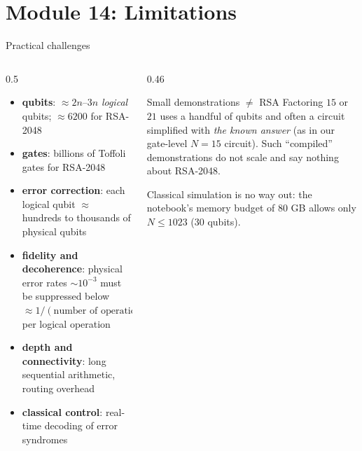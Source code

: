 \documentclass[aspectratio=169,11pt]{beamer}
\newcommand{\key}[1]{{\color{qdark}\textbf{#1}}}
\begin{document}
\section{Module 14: Limitations}
\begin{frame}[label=fLimits]{Practical challenges}
  \begin{columns}[T]
    \begin{column}{0.5\textwidth}
      \small
      \begin{itemize}\itemsep1pt
        \item \key{qubits}: $\approx2n$--$3n$ \emph{logical} qubits; $\approx6200$ for RSA-2048
        \item \key{gates}: billions of Toffoli gates for RSA-2048
        \item \key{error correction}: each logical qubit $\approx$ hundreds to thousands of physical qubits
        \item \key{fidelity and decoherence}: physical error rates $\sim10^{-3}$ must be suppressed below $\approx1/(\text{number of operations}) \sim 10^{-10}$ per logical operation
        \item \key{depth and connectivity}: long sequential arithmetic, routing overhead
        \item \key{classical control}: real-time decoding of error syndromes
      \end{itemize}
    \end{column}
    \begin{column}{0.46\textwidth}
      \begin{alertblock}{Small demonstrations $\neq$ RSA}
        \small Factoring $15$ or $21$ uses a handful of qubits and often a circuit simplified with \emph{the known answer} (as in our gate-level $N = 15$ circuit).
        Such ``compiled'' demonstrations do not scale and say nothing about RSA-2048.
      \end{alertblock}
      \scriptsize Classical simulation is no way out: the notebook's memory budget of 80 GB allows only $N \le 1023$ (30 qubits).
    \end{column}
  \end{columns}
\end{frame}
\end{document}
